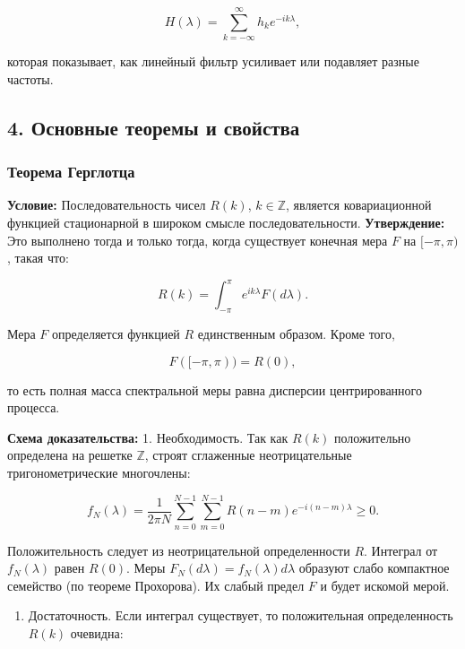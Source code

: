 \documentclass[
  11pt,
  a4paper,
]{article}
\providecommand{\tightlist}{%
  \setlength{\itemsep}{0pt}\setlength{\parskip}{0pt}}
\begin{document}
\[
H(\lambda)=\sum_{k=-\infty}^{\infty}h_k e^{-ik\lambda},
\]

которая показывает, как линейный фильтр усиливает или подавляет разные
частоты.

\subsection{4. Основные теоремы и
свойства}\label{ux43eux441ux43dux43eux432ux43dux44bux435-ux442ux435ux43eux440ux435ux43cux44b-ux438-ux441ux432ux43eux439ux441ux442ux432ux430}

\subsubsection{Теорема
Герглотца}\label{ux442ux435ux43eux440ux435ux43cux430-ux433ux435ux440ux433ux43bux43eux442ux446ux430}

\textbf{Условие:} Последовательность чисел \(R(k)\),
\(k \in \mathbb{Z}\), является ковариационной функцией стационарной в
широком смысле последовательности. \textbf{Утверждение:} Это выполнено
тогда и только тогда, когда существует конечная мера \(F\) на
\([-\pi, \pi)\), такая что:

\[
R(k) = \int_{-\pi}^{\pi} e^{i k \lambda} F(d\lambda).
\]

Мера \(F\) определяется функцией \(R\) единственным образом. Кроме того,

\[
F([-\pi,\pi))=R(0),
\]

то есть полная масса спектральной меры равна дисперсии центрированного
процесса.

\textbf{Схема доказательства:} 1. Необходимость. Так как \(R(k)\)
положительно определена на решетке \(\mathbb{Z}\), строят сглаженные
неотрицательные тригонометрические многочлены:

\[
f_N(\lambda) = \frac{1}{2\pi N} \sum_{n=0}^{N-1} \sum_{m=0}^{N-1} R(n-m) e^{-i(n-m)\lambda} \ge 0.
\]

Положительность следует из неотрицательной определенности \(R\).
Интеграл от \(f_N(\lambda)\) равен \(R(0)\). Меры
\(F_N(d\lambda) = f_N(\lambda) d\lambda\) образуют слабо компактное
семейство (по теореме Прохорова). Их слабый предел \(F\) и будет искомой
мерой.

\begin{enumerate}
\def\labelenumi{\arabic{enumi}.}
\setcounter{enumi}{1}
\tightlist
\item
  Достаточность. Если интеграл существует, то положительная
  определенность \(R(k)\) очевидна:
\end{enumerate}
\end{document}
